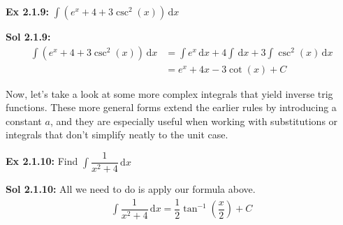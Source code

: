  \begin{tcolorbox}[example]
    \textbf{Ex 2.1.9: } $\int \left(e^x + 4 + 3\csc^2 (x)\right) \,\mathrm{d}x$
 \end{tcolorbox}
 \begin{tcolorbox}[solution]
    \textbf{Sol 2.1.9: } \begin{align*}
        \int \left(e^x + 4 + 3\csc^2 (x)\right) \,\mathrm{d}x &= \int e^x \,\mathrm{d}x + 4\int \,\mathrm{d}x + 3\int \csc^2 (x) \,\mathrm{d}x \\[11pt]
        & = \boxed{e^x + 4x - 3\cot (x) + C}
    \end{align*}
 \end{tcolorbox} 

Now, let's take a look at some more complex integrals that yield inverse trig functions. These more general forms extend the earlier rules by introducing a constant $a$, and they are especially useful when working with substitutions or integrals that don't simplify neatly to the unit case. \par

\begin{center}
\end{center}

\begin{tcolorbox}[example]
    \textbf{Ex 2.1.10: } Find $\int \dfrac{1}{x^2 + 4} \,\mathrm{d}x$
\end{tcolorbox}
\begin{tcolorbox}[solution]
    \textbf{Sol 2.1.10:} All we need to do is apply our formula above. \begin{align*}
        \int \dfrac{1}{x^2 + 4} \,\mathrm{d}x = \boxed{\dfrac{1}{2}\tan^{-1} \left(\dfrac{x}{2}\right) + C}
    \end{align*}
\end{tcolorbox} \vspace{11pt}

